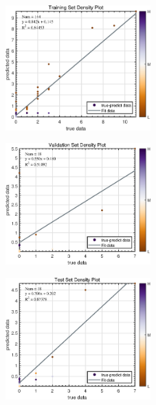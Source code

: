 \documentclass{mcmthesis}
\begin{document}
\begin{figure}[htbp]
    \centering
    \begin{minipage}[t]{0.3\textwidth}
        \centering
        \includegraphics[width=2.2in, keepaspectratio]{pics/1.eps}
        \label{fig:image1}
    \end{minipage}
    \hfill
    \begin{minipage}[t]{0.3\textwidth}
        \centering
        \includegraphics[width=2.2in, keepaspectratio]{pics/3.eps}
        \label{fig:image2}
    \end{minipage}
    \hfill
    \begin{minipage}[t]{0.3\textwidth}
        \centering
        \includegraphics[width=2.2in, keepaspectratio]{pics/5.eps}
        \label{fig:image3}
    \end{minipage}
    
    \vspace{0.4cm} %
    

\end{figure}
\end{document}
